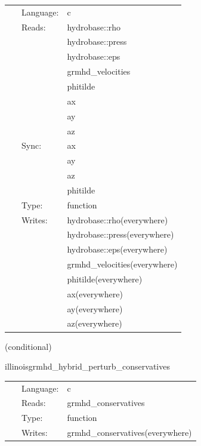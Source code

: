 \documentclass{article}
\begin{document}
\hspace{5mm}

 \begin{tabular*}{160mm}{cll} 
~ & Language:  & c \\ 
~ & Reads:  & hydrobase::rho \\ 
~& ~ &hydrobase::press\\ 
~& ~ &hydrobase::eps\\ 
~& ~ &grmhd\_velocities\\ 
~& ~ &phitilde\\ 
~& ~ &ax\\ 
~& ~ &ay\\ 
~& ~ &az\\ 
~ & Sync:  & ax \\ 
~& ~ &ay\\ 
~& ~ &az\\ 
~& ~ &phitilde\\ 
~ & Type:  & function \\ 
~ & Writes:  & hydrobase::rho(everywhere) \\ 
~& ~ &hydrobase::press(everywhere)\\ 
~& ~ &hydrobase::eps(everywhere)\\ 
~& ~ &grmhd\_velocities(everywhere)\\ 
~& ~ &phitilde(everywhere)\\ 
~& ~ &ax(everywhere)\\ 
~& ~ &ay(everywhere)\\ 
~& ~ &az(everywhere)\\ 
\end{tabular*} 


\vspace{5mm}

   (conditional) 

\hspace{5mm} illinoisgrmhd\_hybrid\_perturb\_conservatives 

\hspace{5mm}{\it hybrid version of illinoisgrmhd\_perturb\_conservatives } 


\hspace{5mm}

 \begin{tabular*}{160mm}{cll} 
~ & Language:  & c \\ 
~ & Reads:  & grmhd\_conservatives \\ 
~ & Type:  & function \\ 
~ & Writes:  & grmhd\_conservatives(everywhere) \\ 
\end{tabular*} 
\end{document}
